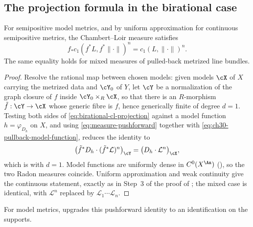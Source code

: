 \subsection{The projection formula in the birational case}
\label{sec:ch30-birational-projection}

\begin{proposition}\label{prop:birational-model-projection}
For semipositive model metrics, and by uniform approximation for continuous
semipositive metrics, the Chambert--Loir measure satisfies
\begin{equation}
\label{eq:birational-cl-projection}
              f_*c_1(f^*L,f^*\|\cdot\|)^n
              =c_1(L,\|\cdot\|)^n.
\end{equation}
The same equality holds for mixed measures of pulled-back metrized line
bundles.
\end{proposition}

\begin{proof}
Resolve the rational map between chosen models: given models $\cX$ of
$X$ carrying the metrized data and $\cY_0$ of $Y$, let $\cY$ be a
normalization of the graph closure of $f$ inside $\cY_0\times_R\cX$,
so that there is an $R$-morphism $\tilde f:\cY\to\cX$ whose generic
fibre is $f$, hence generically finite of degree $d=1$.  Testing both
sides of \eqref{eq:birational-cl-projection} against a model function
$h=\varphi_{D_h}$ on $X$, and using
\eqref{eq:measure-pushforward} together with
\eqref{eq:ch30-pullback-model-function}, reduces the identity to
\[
 \bigl(\tilde f^*D_h\cdot(\tilde f^*\mathcal L)^n\bigr)_{\cY}
 =\bigl(D_h\cdot\mathcal L^n\bigr)_{\cX},
\]
which is  with $d=1$.  Model functions
are uniformly dense in $C^0(X^{\An})$
(), so the two Radon measures
coincide.  Uniform approximation and weak continuity give the continuous
statement, exactly as in Step~3 of the proof of
; the mixed case is identical, with
$\mathcal L^n$ replaced by $\mathcal L_1\cdots\mathcal L_n$.
\end{proof}

For model metrics,  upgrades this
pushforward identity to an identification on the supports.

